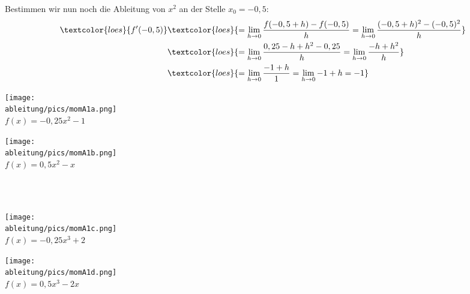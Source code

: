 Bestimmen wir nun noch die Ableitung von \(x^2\) an der Stelle \(x_0=-0,5\):
\begin{align*}
	\textcolor{loes}{f'(-0,5)}&\textcolor{loes}{=\lim\limits_{h\to 0}\frac{f(-0,5+h)-f(-0,5)}{h}=\lim\limits_{h\to 0}\frac{(-0,5+h)^2-(-0,5)^2}{h}}\\
	&\textcolor{loes}{=\lim\limits_{h\to 0}\frac{0,25-h+h^2-0,25}{h}=\lim\limits_{h\to 0}\frac{-h+h^2}{h}}\\
	&\textcolor{loes}{=\lim\limits_{h\to 0}\frac{-1+h}{1}=\lim\limits_{h\to 0}-1+h=-1}
\end{align*}
\newpage
\begin{minipage}{\textwidth}
	\begin{Exercise}[title={\raggedright Schätze jeweils die Ableitung an den Stellen -2 und 1 ab und berechne den Wert dann exakt.}, label=momA1]
		\begin{minipage}{\textwidth}
			\begin{minipage}{0.49\textwidth}
				\centering\texttt{[image: \\ableitung/pics/momA1a.png]}\\
				\(f(x)=-0,25x^2-1\)
			\end{minipage}
			\begin{minipage}{0.49\textwidth}
				\centering\texttt{[image: \\ableitung/pics/momA1b.png]}\\
				\(f(x)=0,5x^2-x\)
			\end{minipage}
		\end{minipage}\\\phantom{x}\\
		\begin{minipage}{\textwidth}
			\begin{minipage}{0.49\textwidth}
				\centering\texttt{[image: \\ableitung/pics/momA1c.png]}\\
				\(f(x)=-0,25x^3+2\)
			\end{minipage}
			\begin{minipage}{0.49\textwidth}
				\centering\texttt{[image: \\ableitung/pics/momA1d.png]}\\
				\(f(x)=0,5x^3-2x\)
			\end{minipage}\\
		\end{minipage}
	\end{Exercise}
\end{minipage}
